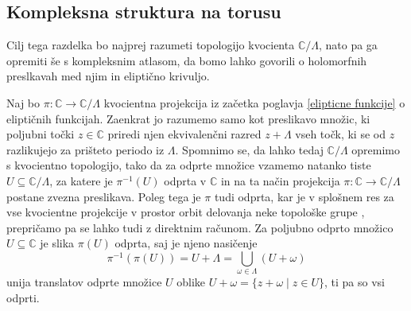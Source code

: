 \documentclass[mat1]{fmfdelo}
\numberwithin{equation}{section}
\newcommand{\C}{\mathbb C}
\newcommand{\om}{\omega}
\newcommand{\inv}{^{-1}}
\theoremstyle{definition}
\begin{document}
\newpage

\subsection{Kompleksna struktura na torusu}
Cilj tega razdelka bo najprej razumeti topologijo kvocienta $\C/\Lambda$, nato pa ga opremiti še s kompleksnim atlasom, da bomo lahko govorili o holomorfnih preslkavah med njim in eliptično krivuljo. 

Naj bo $\pi: \C \to \C/\Lambda$ kvocientna projekcija iz začetka poglavja \ref{elipticne funkcije} o eliptičnih funkcijah. Zaenkrat jo razumemo samo kot preslikavo množic, ki poljubni točki $z \in \C$ priredi njen ekvivalenčni razred $z + \Lambda$ vseh točk, ki se od $z$ razlikujejo za prišteto periodo iz $\Lambda$. Spomnimo se, da lahko tedaj $\C/\Lambda$ opremimo s kvocientno topologijo, tako da za odprte množice vzamemo natanko tiste $U \subseteq \C/\Lambda$, za katere je $\pi\inv (U)$ odprta v $\C$ in na ta način projekcija $\pi:\C \to \C/\Lambda$ postane zvezna preslikava. Poleg tega je $\pi$ tudi odprta, kar je v splošnem res za vse kvocientne projekcije v prostor orbit delovanja neke topološke grupe \cite[Trditev...]{MrcunTop}, prepričamo pa se lahko tudi z direktnim računom. Za poljubno odprto množico $U \subseteq \C$ je slika $\pi(U)$ odprta, saj je njeno nasičenje
\[
    \pi\inv(\pi(U)) = U + \Lambda = \bigcup_{\om \in \Lambda} (U + \om)
\]
unija translatov odprte množice $U$ oblike $U + \om = \{z + \om \mid z \in U \}$, ti pa so vsi odprti. 
\end{document}
